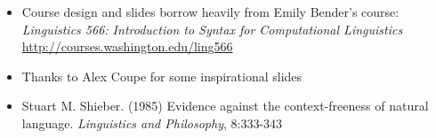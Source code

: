 \documentclass[a4paper,landscape,headrule,footrule]{foils}
\begin{document}

\begin{itemize}
\item Course design and slides borrow heavily from Emily Bender's course:
\textit{Linguistics 566: Introduction to Syntax for Computational Linguistics}
\\ \url{http://courses.washington.edu/ling566}
\item Thanks to Alex Coupe for some inspirational slides
\item Stuart M. Shieber. (1985) Evidence against the context-freeness of natural language. \textit{Linguistics and Philosophy}, 8:333-343
\end{itemize}



\end{document}
